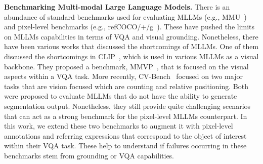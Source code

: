 \textbf{Benchmarking Multi-modal Large Language Models.}
 There is an abundance of standard benchmarks used for evaluating MLLMs (e.g., MMU~\cite{yue2024mmmu}) and pixel-level benchmarks (e.g., refCOCO/+/g~\cite{yu2016modeling,kazemzadeh2014referitgame}). These have pushed the limits on MLLMs capabilities in terms of VQA and visual grounding. Nonetheless, there have been various works that discussed the shortcomings of MLLMs. One of them discussed the shortcomings in CLIP~\cite{radford2021learning}, which is used in various MLLMs as a visual backbone. They proposed a benchmark, MMVP~\cite{tong2024eyes}, that is focused on the visual aspects within a VQA task. More recently, CV-Bench~\cite{tong2024cambrian} focused on two major tasks that are vision focused which are counting and relative positioning. Both were proposed to evaluate MLLMs that do not have the ability to generate segmentation output. Nonetheless, they still provide quite challenging scenarios that can act as a strong benchmark for the pixel-level MLLMs counterpart. In this work, we extend these two benchmarks to augment it with pixel-level annotations and referring expressions that correspond to the object of interest within their VQA task. These help to understand if failures occurring in these benchmarks stem from grounding or VQA capabilities.